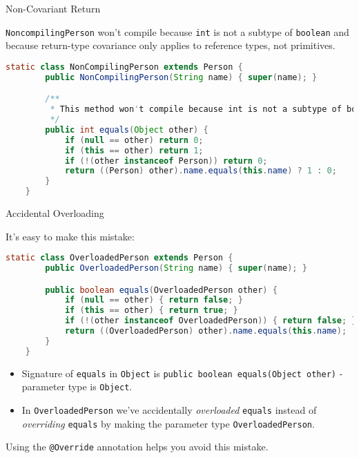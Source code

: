 \documentclass{beamer}
\begin{document}
\begin{frame}[fragile]{Non-Covariant Return}

{\tt NoncompilingPerson} won't compile because {\tt int} is not a subtype of {\tt boolean} and because return-type covariance only applies to reference types, not primitives.
\begin{lstlisting}[language=Java]
    static class NonCompilingPerson extends Person {
        public NonCompilingPerson(String name) { super(name); }

        /**
         * This method won't compile because int is not a subtype of boolean.
         */
        public int equals(Object other) {
            if (null == other) return 0;
            if (this == other) return 1;
            if (!(other instanceof Person)) return 0;
            return ((Person) other).name.equals(this.name) ? 1 : 0;
        }
    }

\end{lstlisting}


\end{frame}

\begin{frame}[fragile]{Accidental Overloading}

It's easy to make this mistake:
\begin{lstlisting}[language=Java]
    static class OverloadedPerson extends Person {
        public OverloadedPerson(String name) { super(name); }

        public boolean equals(OverloadedPerson other) {
            if (null == other) { return false; }
            if (this == other) { return true; }
            if (!(other instanceof OverloadedPerson)) { return false; }
            return ((OverloadedPerson) other).name.equals(this.name);
        }
    }
\end{lstlisting}

\begin{itemize}
\item Signature of {\tt equals} in {\tt Object} is {\tt public boolean equals(Object other)} - parameter type is {\tt Object}.
\item In {\tt OverloadedPerson} we've accidentally {\it overloaded} {\tt equals} instead of {\it overriding} {\tt equals} by making the parameter type {\tt OverloadedPerson}.
\end{itemize}

Using the {\tt @Override} annotation helps you avoid this mistake.

\end{frame}
\end{document}
